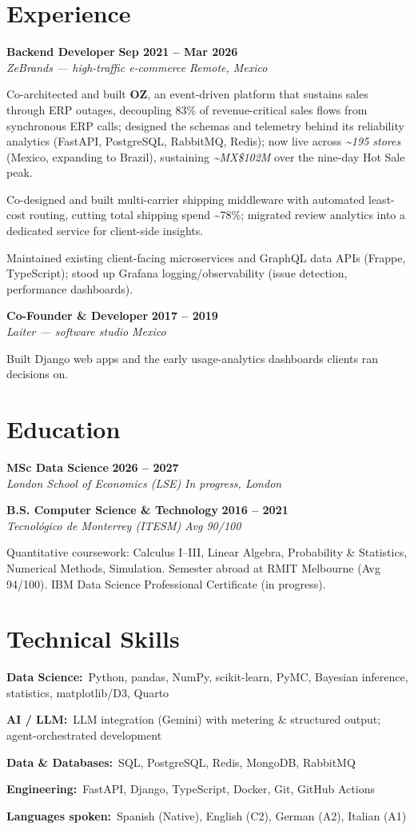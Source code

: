 \documentclass[10pt,a4paper]{article}
\newcommand{\role}[4]{%
  \textbf{#1} \hfill \textbf{#3}\\[1pt]
  {\color{soft}\textit{#2} \hfill \textit{#4}}\par\vspace{2pt}}
\newcommand{\skill}[2]{\textbf{\color{soft}#1:}\ #2\par\vspace{1.5pt}}
\begin{document}
\section*{Experience}
\role{Backend Developer}{ZeBrands — high-traffic e-commerce}{Sep 2021 -- Mar 2026}{Remote, Mexico}
\begin{tight}
  \item Co-architected and built \textbf{OZ}, an event-driven platform that sustains sales through ERP outages, decoupling 83\% of revenue-critical sales flows from synchronous ERP calls; designed the schemas and telemetry behind its reliability analytics (FastAPI, PostgreSQL, RabbitMQ, Redis); now live across \textit{\textasciitilde195 stores} (Mexico, expanding to Brazil), sustaining \textit{\textasciitilde MX\$102M} over the nine-day Hot Sale peak.
  \item Co-designed and built multi-carrier shipping middleware with automated least-cost routing, cutting total shipping spend \textasciitilde78\%; migrated review analytics into a dedicated service for client-side insights.
  \item Maintained existing client-facing microservices and GraphQL data APIs (Frappe, TypeScript); stood up Grafana logging/observability (issue detection, performance dashboards).
\end{tight}
\vspace{3pt}
\role{Co-Founder \& Developer}{Laiter — software studio}{2017 -- 2019}{Mexico}
\begin{tight}
  \item Built Django web apps and the early usage-analytics dashboards clients ran decisions on.
\end{tight}

\section*{Education}
\role{MSc Data Science}{London School of Economics (LSE)}{2026 -- 2027}{In progress, London}
\vspace{2pt}
\role{B.S. Computer Science \& Technology}{Tecnológico de Monterrey (ITESM)}{2016 -- 2021}{Avg 90/100}
\vspace{1pt}
{\color{soft}\small Quantitative coursework: Calculus I--III, Linear Algebra, Probability \& Statistics, Numerical Methods, Simulation. Semester abroad at RMIT Melbourne (Avg 94/100). IBM Data Science Professional Certificate (in progress).}

\section*{Technical Skills}
\skill{Data Science}{Python, pandas, NumPy, scikit-learn, PyMC, Bayesian inference, statistics, matplotlib/D3, Quarto}
\skill{AI / LLM}{LLM integration (Gemini) with metering \& structured output; agent-orchestrated development}
\skill{Data \& Databases}{SQL, PostgreSQL, Redis, MongoDB, RabbitMQ}
\skill{Engineering}{FastAPI, Django, TypeScript, Docker, Git, GitHub Actions}
\skill{Languages spoken}{Spanish (Native), English (C2), German (A2), Italian (A1)}
\end{document}
